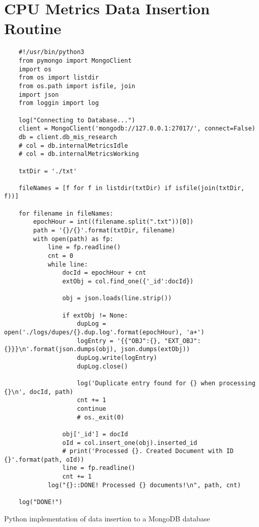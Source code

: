 \chapter{CPU Metrics Data Insertion Routine}
\begin{code}
    \begin{verbatim}
    #!/usr/bin/python3
    from pymongo import MongoClient
    import os
    from os import listdir
    from os.path import isfile, join
    import json
    from loggin import log
    
    log("Connecting to Database...")
    client = MongoClient('mongodb://127.0.0.1:27017/', connect=False)
    db = client.db_mis_research
    # col = db.internalMetricsIdle
    # col = db.internalMetricsWorking
    
    txtDir = './txt'
    
    fileNames = [f for f in listdir(txtDir) if isfile(join(txtDir, f))]
    
    for filename in fileNames:
    	epochHour = int((filename.split(".txt"))[0])
    	path = '{}/{}'.format(txtDir, filename)
    	with open(path) as fp:  
    		line = fp.readline()
    		cnt = 0
    		while line:
    			docId = epochHour + cnt
    			extObj = col.find_one({'_id':docId})
    
    			obj = json.loads(line.strip())
    
    			if extObj != None:
    				dupLog = open('./logs/dupes/{}.dup.log'.format(epochHour), 'a+')
    				logEntry = '{{"OBJ":{}, "EXT_OBJ":{}}}\n'.format(json.dumps(obj), json.dumps(extObj))
    				dupLog.write(logEntry)
    				dupLog.close()
    
    				log('Duplicate entry found for {} when processing {}\n', docId, path)
    				cnt += 1
    				continue
    				# os._exit(0)
    
    			obj['_id'] = docId
    			oId = col.insert_one(obj).inserted_id
    			# print('Processed {}. Created Document with ID {}'.format(path, oId))
    			line = fp.readline()
    			cnt += 1
    		log("{}::DONE! Processed {} documents!\n", path, cnt)
    
    log("DONE!")
    \end{verbatim}
    \caption{Python implementation of data insertion to a MongoDB database}
    \label{lst:py_class_float}
\end{code}